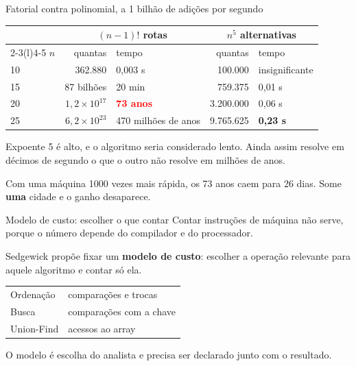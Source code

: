 \documentclass{beamer}
\newcommand{\hl}[1]{\textcolor{red}{\textbf{#1}}}
\begin{document}
\begin{frame}{Fatorial contra polinomial, a 1 bilhão de adições por segundo}
	\begin{center}
		\small
		\begin{tabular}{@{}lrlrl@{}}
			\toprule
			    & \multicolumn{2}{c}{$(n-1)!$ rotas} & \multicolumn{2}{c}{$n^5$ alternativas}                                                           \\
			\cmidrule(r){2-3}\cmidrule(l){4-5}
			$n$ & quantas                            & tempo                                  & quantas   & tempo                                       \\
			\midrule
			10  & 362.880                            & 0,003 s                              & 100.000   & insignificante                              \\
			15  & 87 bilhões                         & 20 min                                 & 759.375   & 0,01 s                                      \\
			20  & $1,2 \times 10^{17}$               & \hl{73 anos}                           & 3.200.000 & 0,06 s                                      \\
			25  & $6,2 \times 10^{23}$               & 470 milhões de anos                    & 9.765.625 & \textcolor{green!50!black}{\textbf{0,23 s}} \\
			\bottomrule
		\end{tabular}
	\end{center}

	\vspace{0.4cm}
	\pause
	Expoente 5 é alto, e o algoritmo seria considerado lento. Ainda assim resolve
	em décimos de segundo o que o outro não resolve em milhões de anos.

	\vspace{0.2cm}
	\pause
	Com uma máquina 1000 vezes mais rápida, os 73 anos caem para 26 dias. Some
	\textbf{uma} cidade e o ganho desaparece.
\end{frame}

\begin{frame}{Modelo de custo: escolher o que contar}
	Contar instruções de máquina não serve, porque o número depende do
	compilador e do processador.

	\vspace{0.4cm}
	Sedgewick propõe fixar um \textbf{modelo de custo}: escolher a operação
	relevante para aquele algoritmo e contar só ela.

	\begin{center}
		\small
		\begin{tabular}{@{}ll@{}}
			\toprule
			Ordenação  & comparações e trocas    \\
			Busca      & comparações com a chave \\
			Union-Find & acessos ao array        \\
			\bottomrule
		\end{tabular}
	\end{center}

	\vspace{0.3cm}
	\footnotesize O modelo é escolha do analista e precisa ser declarado junto
	com o resultado.
\end{frame}
\end{document}

